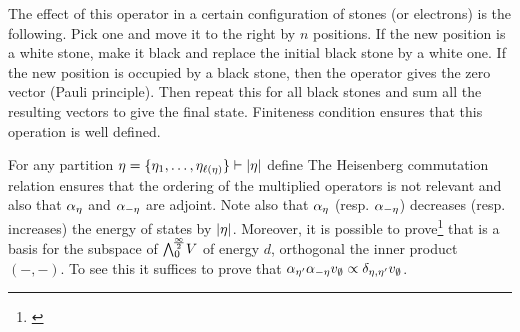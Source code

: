 \documentclass[../main/main.tex]{subfiles}
\begin{document}
The effect of this operator in a certain configuration of stones (or electrons) is the following. Pick one and move it to the right by $n$ positions. If the new position is a white stone, make it black and replace the initial black stone by a white one. If the new position is occupied by a black stone, then the operator gives the zero vector (Pauli principle). Then repeat this for all black stones and sum all the resulting vectors to give the final state. Finiteness condition ensures that this operation is well defined. 

For any partition $\eta=\{\eta_1,\ldots,\eta_{\ell(\eta)}\}\vdash|\eta|$ define
The Heisenberg commutation relation ensures that the ordering of the multiplied operators is not relevant and also that $\alpha_\eta$ and $\alpha_{-\eta}$ are adjoint. Note also that $\alpha_{\eta}$ (resp. $\alpha_{-\eta}$) decreases (resp. increases) the energy of states by $|\eta|$. Moreover, it is possible to prove\footnote{\cite[Lemma 2.12]{J}} that 
is a basis for the subspace of $\bigwedge^{\!\frac\infty2}_0\!V$ of energy $d$, orthogonal \wrt the inner product $(-,-)$. To see this it suffices to prove that $\alpha_{\eta'}\alpha_{-\eta}v_\emptyset\propto \delta_{\eta,\eta'}v_\emptyset$.
\end{document}
